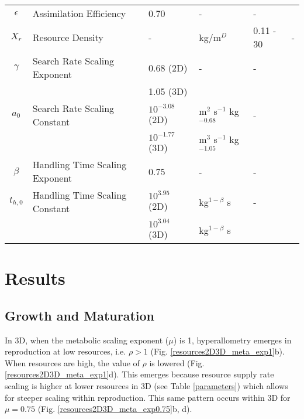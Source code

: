\documentclass[a4paper, 11pt, hidelinks]{article} %
\begin{document}
\begin{centering}
\begin{table}[h!]
{\begin{tabular}{c p{3.9cm} l l l p{3cm}}
				$\epsilon$	& Assimilation Efficiency & 0.70 & - & - 		& \cite{Peters1983} \\
				$X_r$ 		& Resource Density		& -		& kg/m$^D$		& 0.11 - 30				& -\\
				$\gamma$	& Search Rate Scaling Exponent & 0.68 (2D)	& - & - & \cite{Pawar2012} \\
				&						& 1.05 (3D)\\
				$a_0$		& Search Rate Scaling Constant & $10^{-3.08}$ (2D) & m$^2$ s$^{-1}$ kg$^{-0.68}$   & - &\cite{Pawar2012}	\\
				&						& $10^{-1.77}$ (3D)& m$^3$ s$^{-1}$ kg$^{-1.05} $\\
				$\beta$		& Handling Time Scaling Exponent& 0.75 & - & - & \cite{Pawar2012}\\
				$t_{h, 0}$	& Handling Time Scaling Constant& $10^{3.95}$ (2D) &kg$^{1-\beta}$ s& -& \cite{Pawar2012}	\\
				&						& $10^{3.04}$ (3D)			&kg$^{1-\beta}$ s\\
				\hline
			\end{tabular}
		}%
		\end{table}
	\end{centering}

	\newpage

\section{Results}
	
	\subsection{Growth and Maturation}
	In 3D, when the metabolic scaling exponent ($ \mu $) is 1, hyperallometry emerges in reproduction at low resources, i.e. $ \rho > 1 $ (Fig. \ref{resources2D3D_meta_exp1}b).  When resources are high, the value of $ \rho $ is lowered (Fig. \ref{resources2D3D_meta_exp1}d).  This emerges because resource supply rate scaling is higher at lower resources in 3D (see Table \ref{parameters}) which allows for steeper scaling within reproduction.  This same pattern occurs within 3D for $ \mu = 0.75$ (Fig. \ref{resources2D3D_meta_exp0.75}b, d).  
	
\end{document}
